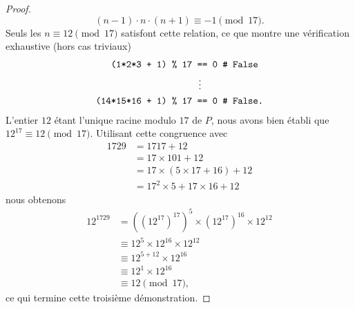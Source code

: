 \begin{proof}
\begin{equation}
  (n-1) \cdot n \cdot (n+1) \equiv -1 \pmod{17}.
\end{equation}
%
Seuls les $n \equiv 12 \pmod{17}$ satisfont cette relation, ce que montre une vérification exhaustive (hors cas triviaux)
%
\begin{align}
  \text{\texttt{(1*2*3 + 1) \% 17 }}&\text{\texttt{== 0    \# False}}\\
  &\hspace{0.14em}\vdots \nonumber\\
  \text{\texttt{(14*15*16 + 1) \% 17 }}&\text{\texttt{== 0    \# False.}}
\end{align}
%
L'entier $12$ étant l'unique racine modulo %
$17$ de $P$, nous avons bien établi que $12^{17} \equiv 12 \pmod{17}$. Utilisant cette congruence avec 
%
\begin{align}
  1729 &= 1717 + 12 \\
  &= 17 \times 101  + 12 \\
  &= 17 \times (5 \times 17 + 16) + 12 \\
  &= 17^2 \times 5 + 17 \times 16 + 12 
\end{align}
%
nous obtenons 
%
\begin{align}
  12^{1729} &= ((12^{17})^{17})^5 \times (12^{17})^{16} \times 12^{12} \\
  &\equiv 12^5 \times 12^{16} \times 12^{12} \\
  &\equiv 12^{5+12} \times 12^{16} \\
  &\equiv 12^1 \times 12^{16} \\
  &\equiv 12 \pmod{17},
\end{align}
%
ce qui termine cette troisième démonstration.
%

\end{proof}
